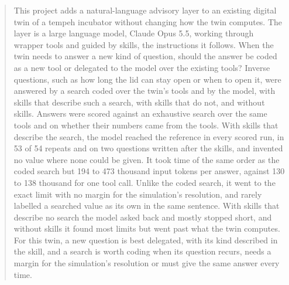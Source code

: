   \begin{abstract}
  This project adds a natural-language advisory layer to an existing digital twin of a tempeh
  incubator without changing how the twin computes. The layer is a large language model, Claude
  Opus 5.5, working through wrapper tools and guided by skills, the instructions it follows. When
  the twin needs to answer a new kind of question, should the answer be coded as a new tool or
  delegated to the model over the existing tools? Inverse questions, such as how long the lid can
  stay open or when to open it, were answered by a search coded over the twin's tools and by the
  model, with skills that describe such a search, with skills that do not, and without skills.
  Answers were scored against an exhaustive search over the same tools and on whether their
  numbers came from the tools. With skills that describe the search, the model reached the
  reference in every scored run, in 53 of 54 repeats and on two questions written after the
  skills, and invented no value where none could be given. It took time of the same order as the
  coded search but 194 to 473 thousand input tokens per answer, against 130 to 138 thousand for
  one tool call. Unlike the coded search, it went to the exact limit with no margin for the
  simulation's resolution, and rarely labelled a searched value as its own in the same sentence.
  With skills that describe no search the model asked back and mostly stopped short, and without
  skills it found most limits but went past what the twin computes. For this twin, a new question
  is best delegated, with its kind described in the skill, and a search is worth coding when its
  question recurs, needs a margin for the simulation's resolution or must give the same answer
  every time.
  \end{abstract}

